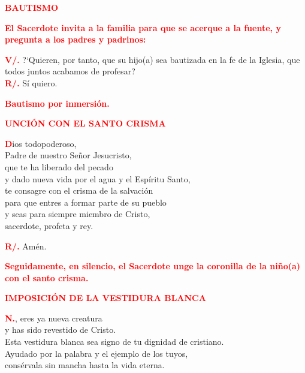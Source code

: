 \documentclass[12pt, letterpaper]{report}
\begin{document}
\Large {\bfseries \textcolor{red}{BAUTISMO}} \newline

\large {\bfseries \textcolor{red}{El Sacerdote invita a la familia para que se acerque a la fuente, y pregunta a los padres y padrinos:}} \newline

\noindent
\Large {\bfseries \textcolor{red}{V/.}} \hspace{0.5cm} ?`Quieren, por tanto, que su hijo(a) sea bautizada en la fe de la Iglesia, que todos juntos acabamos de profesar? \\
\Large {\bfseries \textcolor{red}{R/.}} \hspace{0.5cm} S\'i quiero. \newline

\large {\bfseries \textcolor{red}{Bautismo por inmersi\'on.}} \newline

\Large {\bfseries \textcolor{red}{UNCI\'ON CON EL SANTO CRISMA}} \newline

\lettrine[lines=1]{\bfseries \textcolor{red}{D}}{}\Large ios todopoderoso, \\
Padre de nuestro Se\~nor Jesucristo, \\
que te ha liberado del pecado \\
y dado nueva vida por el agua y el Esp\'iritu Santo, \\
te consagre con el crisma de la salvaci\'on \\
para que entres a formar parte de su pueblo \\
y seas para siempre miembro de Cristo, \\
sacerdote, profeta y rey. \newline

\noindent
\Large {\bfseries \textcolor{red}{R/.}} \hspace{0.5cm} Am\'en. \newline

\large {\bfseries \textcolor{red}{Seguidamente, en silencio, el Sacerdote unge la coronilla de la ni\~no(a) con el santo crisma.}} \newline

\Large {\bfseries \textcolor{red}{IMPOSICI\'ON DE LA VESTIDURA BLANCA}} \newline

\lettrine[lines=1]{\bfseries \textcolor{red}{N.}}{}\Large , eres ya nueva creatura \\
y has sido revestido de Cristo. \\
Esta vestidura blanca sea signo de tu dignidad de cristiano. \\
Ayudado por la palabra y el ejemplo de los tuyos, \\
cons\'ervala sin mancha hasta la vida eterna. \newline
\end{document}
